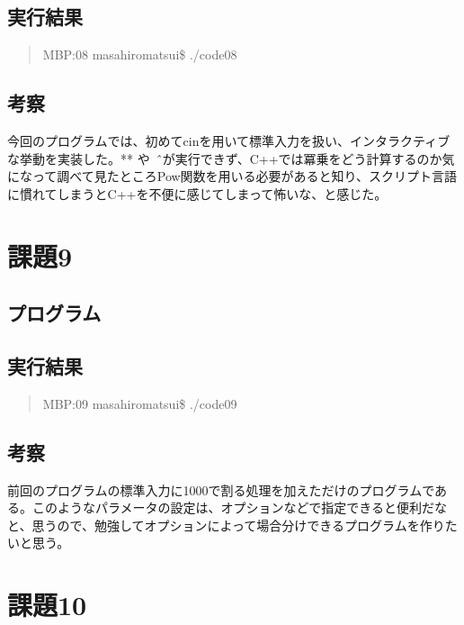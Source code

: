 \documentclass[11pt,a4paper]{jsarticle}
\begin{document}
\subsection{実行結果}
\begin{quote}           %
MBP:08 masahiromatsui\$ ./code08 \\

\end{quote}

%
\subsection{考察}
今回のプログラムでは、初めてcinを用いて標準入力を扱い、インタラクティブな挙動を実装した。**
や\^　が実行できず、C++では冪乗をどう計算するのか気になって調べて見たところPow関数を用いる必要があると知り、スクリプト言語に慣れてしまうとC++を不便に感じてしまって怖いな、と感じた。
%

\section{課題9}

\subsection{プログラム}
\label{sec:prog-list1}

%
\subsection{実行結果}
\begin{quote}           %
MBP:09 masahiromatsui\$ ./code09 \\

\end{quote}
%
\subsection{考察}
前回のプログラムの標準入力に1000で割る処理を加えただけのプログラムである。このようなパラメータの設定は、オプションなどで指定できると便利だなと、思うので、勉強してオプションによって場合分けできるプログラムを作りたいと思う。
%
\section{課題10}
\end{document}
